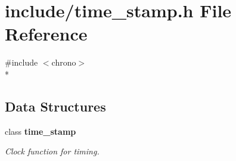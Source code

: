 \section{include/time\-\_\-stamp.h File Reference}
\label{d3/dd0/time__stamp_8h}
{\ttfamily \#include $<$chrono$>$}\\*
\subsection*{Data Structures}
\begin{DoxyCompactItemize}
\item 
class {\bf time\-\_\-stamp}
\begin{DoxyCompactList}\small\item\em Clock function for timing. \end{DoxyCompactList}\end{DoxyCompactItemize}
